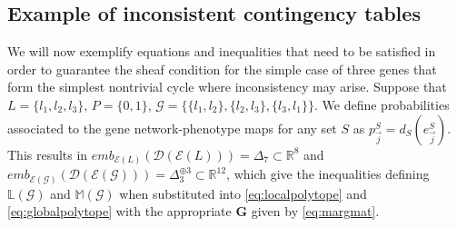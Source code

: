 \subsection{Example of inconsistent contingency tables}\label{sec:inconsistency}
We will now exemplify equations and inequalities that need to be satisfied in order to guarantee the sheaf condition for the simple case of three genes that form the simplest nontrivial cycle where inconsistency may arise. Suppose that $L = \{l_1,l_2,l_3\}$, $P = \{0,1\}$, $\mathcal{G} = \{\{l_1,l_2\},\{l_2,l_3\},\{l_3,l_1\}\}$. We define probabilities associated to the gene network-phenotype maps for any set $S$ as $p^S_{\vec{j}}= d_{S}(e^S_{\vec{j}})$. This results in $emb_{\mathcal{E}(L)}(\mathcal{D}(\mathcal{E}(L))) = \Delta_7 \subset \mathbb{R}^8 $ and $emb_{\mathcal{E}(\mathcal{G})}(\mathcal{D}(\mathcal{E}(\mathcal{G}))) = \Delta^{\oplus 3}_3 \subset \mathbb{R}^{12}$,
which give the inequalities defining $\mathbb{L}(\mathcal{G})$ and $\mathbb{M}(\mathcal{G})$ when substituted into \ref{eq:localpolytope} and \ref{eq:globalpolytope} with the appropriate $\mathbf{G}$ given by \ref{eq:margmat}.


